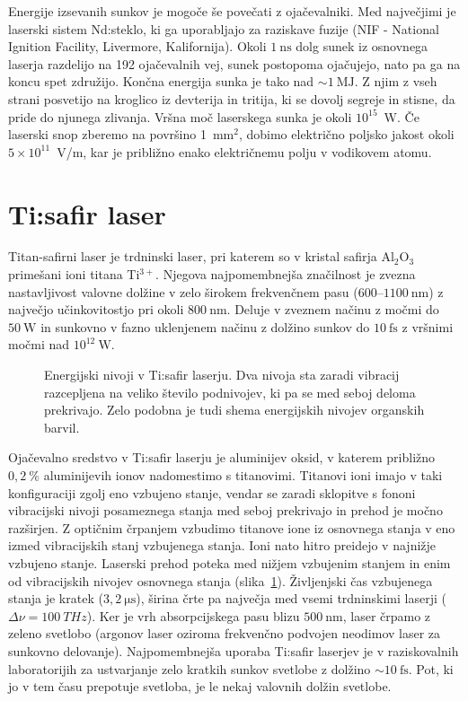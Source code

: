 \begin{remark}
Energije izsevanih sunkov je mogoče še povečati z ojačevalniki. Med največjimi je
laserski sistem Nd:steklo, ki ga uporabljajo za raziskave fuzije (NIF - National Ignition Facility, 
Livermore, Kalifornija).
Okoli $1~\si{\nano\second}$ dolg sunek iz osnovnega laserja razdelijo na 192
ojačevalnih vej, sunek postopoma ojačujejo, nato pa ga na koncu spet združijo.
Končna energija sunka je tako nad $\sim 1~\si{\mega\joule}$. Z njim z vseh strani posvetijo na
kroglico iz devterija in tritija, ki se dovolj segreje in stisne, da pride
do njunega zlivanja. Vršna moč laserskega sunka je okoli $10^{15}$~W. 
Če laserski snop zberemo na površino 1~mm$^2$, dobimo električno poljsko jakost
okoli $5 \times 10^{11}$~V/m, kar je približno enako električnemu polju v vodikovem atomu.
\end{remark}

\section{Ti:safir laser}
Titan-safirni laser je trdninski laser, pri katerem so v kristal safirja
Al$_2$O$_3$ primešani ioni titana Ti$^{3+}$. Njegova najpomembnejša značilnost je
zvezna nastavljivost valovne dolžine v zelo širokem frekvenčnem pasu 
($600$--$1100~\si{\nano\metre}$) z največjo učinkovitostjo pri okoli $800~\si{\nano\metre}$. Deluje
v zveznem načinu z močmi do $50~\si{\watt}$ in sunkovno  v fazno uklenjenem načinu 
z dolžino sunkov do $10~\si{\femto\second}$ z vršnimi močmi nad $10^{12}~\si{\watt}$. 
\begin{figure}[h]
\centering
\def\svgwidth{90truemm} 

\caption{Energijski nivoji v Ti:safir laserju. Dva nivoja sta zaradi vibracij
razcepljena na veliko število podnivojev, ki pa se med seboj deloma prekrivajo.
Zelo podobna je tudi shema energijskih nivojev organskih barvil. 
}
\label{fig:TiE}
\end{figure} 

Ojačevalno sredstvo v Ti:safir laserju je aluminijev oksid, v katerem 
približno $0,2~\%$ aluminijevih ionov nadomestimo s titanovimi. Titanovi ioni imajo 
v taki konfiguraciji zgolj eno vzbujeno stanje, vendar se zaradi sklopitve s fononi
vibracijski nivoji posameznega stanja med seboj prekrivajo in prehod je močno razširjen. 
Z optičnim črpanjem vzbudimo titanove ione iz osnovnega stanja v eno izmed vibracijskih 
stanj vzbujenega stanja. Ioni nato hitro preidejo v najnižje vzbujeno stanje. 
Laserski prehod poteka med nižjem vzbujenim stanjem in enim od vibracijskih 
nivojev osnovnega stanja (slika~\ref{fig:TiE}). Življenjski čas
vzbujenega stanja je kratek ($3,2~\si{\micro\second}$), širina črte pa največja med
vsemi trdninskimi laserji ($\Delta \nu =  100~\si{THz}$). 
Ker je vrh absorpcijskega pasu blizu $500~\si{\nano\metre}$,
laser črpamo z zeleno svetlobo (argonov laser oziroma
frekvenčno podvojen neodimov laser za sunkovno delovanje). 
Najpomembnejša uporaba Ti:safir laserjev je v raziskovalnih laboratorijih za ustvarjanje zelo 
kratkih sunkov svetlobe z dolžino $\sim 10~\si{\femto\second}$. Pot, ki jo 
v tem času prepotuje svetloba, je le nekaj valovnih dolžin svetlobe. 

